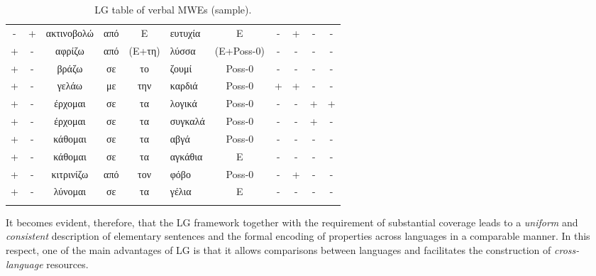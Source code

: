 \documentclass[output=paper]{langsci/langscibook}
\begin{document}
\begin{table}
\small
\begin{tabularx}{\textwidth}{ccccc Q ccccc}
\lsptoprule
{} &  &&&\raisebox{5mm}{$\langle$ E $\rangle$} &&&  &  &  &  \\
\midrule 
- & +     & ακτινοβολώ  & από & E & ευτυχία & E      & - & + & - & - \\
 
+ & -     & αφρίζω      & από & (E+τη) & λύσσα & (E+Poss-0)   & - & - & - & - \\
 
+ & -     & βράζω       & σε  & το    & ζουμί & Poss-0    & - & - & - & - \\
 
+ & -     & γελάω       & με  & την    & καρδιά & Poss-0  & + & + & - & - \\
 
+ & -     & έρχομαι     & σε  & τα     & λογικά & Poss-0  & - & - & + & + \\
 
+ & -     & έρχομαι     & σε  & τα     & συγκαλά & Poss-0 & - & - & + & - \\
 
+ & -     & κάθομαι     & σε  & τα     & αβγά & Poss-0    & - & - & - & - \\
 
+ & -     & κάθομαι     & σε  & τα    & αγκάθια & E  & - & - & - & - \\
 
+ & -     & κιτρινίζω   & από & τον     & φόβο & Poss-0   & - & + & - & - \\
 
+ & -     & λύνομαι     & σε  & τα     & γέλια & E   & - & - & - & - \\
\lspbottomrule 
\end{tabularx}
\caption{LG table of verbal MWEs (sample).}
\label{fig:03:01}
\end{table}

It becomes evident, therefore, that the LG framework together with the
requirement of substantial coverage leads to a
\textit{uniform} and \textit{consistent}
description of elementary sentences and the formal encoding of
properties across languages in a comparable manner. In this respect,
one of the main advantages of LG is that it allows comparisons between
languages and facilitates the construction of
\textit{cross-language} resources.
\end{document}
